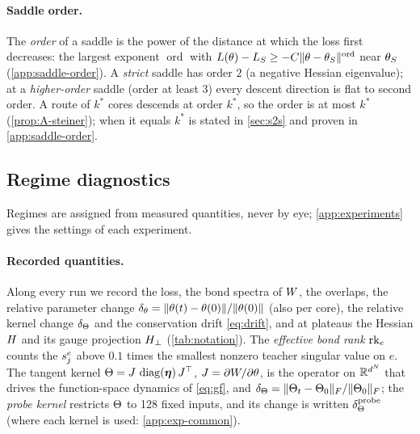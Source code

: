\paragraph{Saddle order.}
The \emph{order} of a saddle is the power of the distance at which the loss first decreases: the
largest exponent $\operatorname{ord}$ with
$L(\theta)-L_S\ge-C\lVert\theta-\theta_S\rVert^{\operatorname{ord}}$ near $\theta_S$
(\cref{app:saddle-order}). A \emph{strict} saddle has order $2$ (a negative Hessian eigenvalue); at a
\emph{higher-order} saddle (order at least $3$) every descent direction is flat to second order. A
route of $k^*$ cores descends at order $k^*$, so the order is at most $k^*$ \proven{}
(\cref{prop:A-steiner}); when it equals $k^*$ is stated in \cref{sec:s2s} and proven in
\cref{app:saddle-order}.

\subsection{Regime diagnostics}\label{sec:setup-diagnostics}

Regimes are assigned from measured quantities, never by eye; \cref{app:experiments} gives the
settings of each experiment.

\paragraph{Recorded quantities.}
Along every run we record the loss, the bond spectra of $W$, the overlaps, the relative parameter
change $\delta_{\theta}=\lVert\theta(t)-\theta(0)\rVert/\lVert\theta(0)\rVert$ (also per core), the relative kernel change
$\delta_{\Theta}$ and the conservation drift \eqref{eq:drift}, and at plateaus the Hessian $H$ and its gauge
projection $H_{\perp}$ (\cref{tab:notation}). The \emph{effective bond rank} $\operatorname{rk}_{e}$ counts
the $s^{e}_{j}$ above $0.1$ times the smallest nonzero teacher singular value on $e$. The tangent kernel
$\Theta=J\,\operatorname{diag}(\boldsymbol{\eta})\,J^{\top}$, $J=\partial W/\partial\theta$, is the operator on
$\mathbb{R}^{d^N}$ that drives the function-space dynamics of \eqref{eq:gf}, and
$\delta_{\Theta}=\lVert\Theta_t-\Theta_0\rVert_{F}/\lVert\Theta_0\rVert_{F}$; the \emph{probe kernel} restricts $\Theta$ to 128 fixed inputs, and
its change is written $\delta_{\Theta}^{\rm probe}$ (where each kernel is used: \cref{app:exp-common}).

